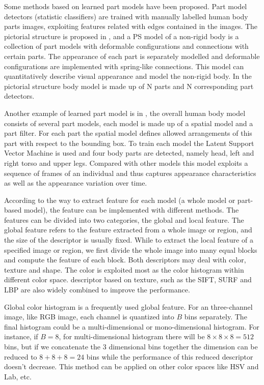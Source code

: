 Some methods based on learned part models have been proposed. Part model detectors (statistic classifiers) are trained with manually labelled human body parts images, exploiting features related with edges contained in the images. The pictorial structure is proposed in \cite{PictorialModel}, and a PS model of a non-rigid body is a collection of part models with deformable configurations and connections with certain parts. The appearance of each part is separately modelled and deformable configurations are implemented with spring-like connections. This model can quantitatively describe visual appearance and model the non-rigid body. In \cite{PSmodelRevisit} the pictorial structure body model is made up of N parts and N corresponding part detectors. 

Another example of learned part model is in \cite{MultiPersonREID, PartbasedSTReid}, the overall human body model consists of several part models, each model is made up of a spatial model and a part filter. For each part the spatial model defines allowed arrangements of this part with respect to the bounding box. To train each model the Latent Support Vector Machine is used and four body parts are detected, namely head, left and right torso and upper legs. Compared with other models this model exploits a sequence of frames of an individual and thus captures appearance characteristics as well as the appearance variation over time.

According to the way to extract feature for each model (a whole model or part-based model), the feature can be implemented with different methods. The features can be divided into two categories, the global and local feature. The global feature refers to the feature extracted from a whole image or region, and the size of the descriptor is usually fixed. While to extract the local feature of a specified image or region, we first divide the whole image into many equal blocks and compute the feature of each block.  Both descriptors may deal with color, texture and shape. The color is exploited most as the color histogram within different color space. descriptor based on texture, such as the SIFT, SURF and LBP are also widely combined to improve the performance.

Global color histogram is a frequently used global feature. For an three-channel image, like RGB image, each channel is quantized into $B$ bins separately. The final histogram could be a multi-dimensional or mono-dimensional histogram. For instance, if $B = 8$, for multi-dimensional histogram there will be  $8\times 8\times 8 = 512$ bins, but if we concatenate the 3 dimensional bins together the dimension can be reduced to $8 + 8 + 8 = 24$ bins while the performance of this reduced descriptor doesn't decrease. This method can be applied on other color spaces like HSV and Lab, etc.

